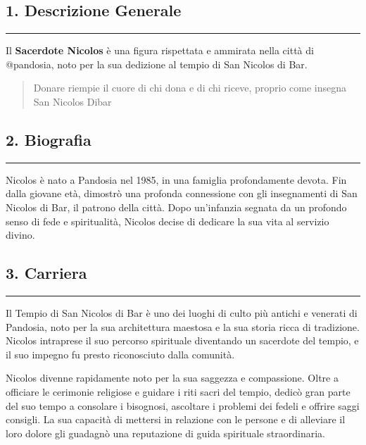 \subsection{1. Descrizione Generale}\label{descrizione-generale}

\begin{center}\rule{0.5\linewidth}{0.5pt}\end{center}

Il \textbf{Sacerdote Nicolos} è una figura rispettata e ammirata nella
città di @pandosia, noto per la sua dedizione al tempio di San Nicolos
di Bar.

\begin{quote}
Donare riempie il cuore di chi dona e di chi riceve, proprio come
insegna San Nicolos Dibar
\end{quote}

\subsection{2. Biografia}\label{biografia}

\begin{center}\rule{0.5\linewidth}{0.5pt}\end{center}

Nicolos è nato a Pandosia nel 1985, in una famiglia profondamente
devota. Fin dalla giovane età, dimostrò una profonda connessione con gli
insegnamenti di San Nicolos di Bar, il patrono della città. Dopo
un'infanzia segnata da un profondo senso di fede e spiritualità, Nicolos
decise di dedicare la sua vita al servizio divino.

\subsection{3. Carriera}\label{carriera}

\begin{center}\rule{0.5\linewidth}{0.5pt}\end{center}

Il Tempio di San Nicolos di Bar è uno dei luoghi di culto più antichi e
venerati di Pandosia, noto per la sua architettura maestosa e la sua
storia ricca di tradizione. Nicolos intraprese il suo percorso
spirituale diventando un sacerdote del tempio, e il suo impegno fu
presto riconosciuto dalla comunità.

Nicolos divenne rapidamente noto per la sua saggezza e compassione.
Oltre a officiare le cerimonie religiose e guidare i riti sacri del
tempio, dedicò gran parte del suo tempo a consolare i bisognosi,
ascoltare i problemi dei fedeli e offrire saggi consigli. La sua
capacità di mettersi in relazione con le persone e di alleviare il loro
dolore gli guadagnò una reputazione di guida spirituale straordinaria.

